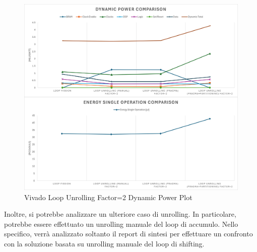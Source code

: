 \begin{figure}[H]
    \centering
    \includegraphics[width=\textwidth]{solutions/loop_unrolling/factor2/loopunrollingfactor2power.png}
    \caption{Vivado Loop Unrolling Factor=2 Dynamic Power Plot}
    \label{fig:vivado-loop-unrolling-factor2-solution-power-plot}
\end{figure}


Inoltre, si potrebbe analizzare un ulteriore caso di unrolling. In particolare, potrebbe essere effettuato un unrolling manuale del loop di accumulo. Nello specifico, verrà analizzato soltanto il report di sintesi per effettuare un confronto con la soluzione basata su unrolling manuale del loop di shifting.



